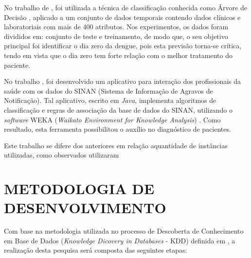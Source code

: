\documentclass[
	12pt,				%
	openright,			%
	oneside,	
	a4paper,				%
	english,				%
	brazil				%
]{abntex2/abntex2} %
\begin{document}
	No trabalho de \cite{thitiprayoonwongse:2012}, foi utilizada a técnica de classificação conhecida como Árvore de Decisão \cite{tan:2009}, aplicado a um conjunto de dados temporais contendo dados clínicos e laboratoriais com mais de 400 atributos. Nos experimentos, os dados foram divididos em: conjunto de teste e treinamento, de modo que, o seu objetivo principal foi identificar o dia zero da dengue, pois esta previsão torna-se crítica, tendo em vista que o dia zero tem forte relação com o melhor tratamento do paciente.
	
	No trabalho \cite{santos:2011}, foi desenvolvido um aplicativo para interação dos profissionais da saúde com os dados do SINAN (Sistema de Informação de Agravos de Notificação). Tal aplicativo, escrito em  \textit{Java}\cite{oracle:2015}, implementa algoritmos de classificação e regras de associação da base de dados do SINAN, utilizando o \textit{software} WEKA (\textit{Waikato Environment for Knowledge Analysis}) \cite{weka:2015}. Como resultado, esta ferramenta possibilitou o auxílio no diagnóstico de pacientes.
	
	Este trabalho se difere dos anteriores em relação aquantidade de instâncias utilizadas, como observados utilizaram 

	\section{METODOLOGIA DE DESENVOLVIMENTO}
		
		Com base na metodologia utilizada no processo de Descoberta de Conhecimento em Base de Dados (\textit{Knowledge Dicovery in Databases} - KDD) definida em \cite{fayyad:1996}, a realização desta pesquisa será composta das seguintes etapas:
		
\end{document}
